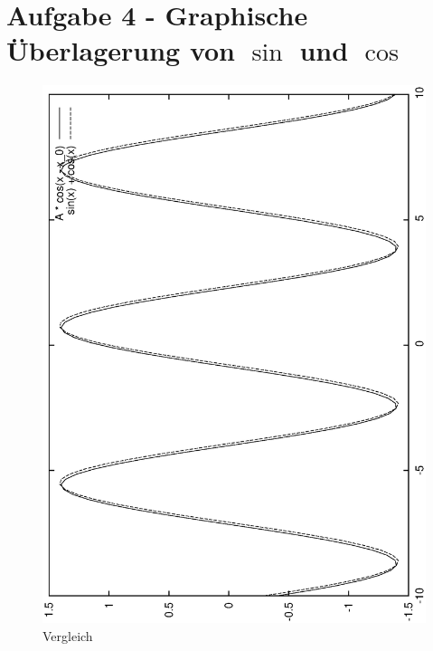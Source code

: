 \section{Aufgabe 4 - Graphische Überlagerung von $\sin$ und $\cos$}



\begin{figure}[h!]
  \begin{center}
    \includegraphics{grafiken/vergleich}
  \end{center}
  \caption{Vergleich}
  \label{fig:vergleich}
\end{figure}


